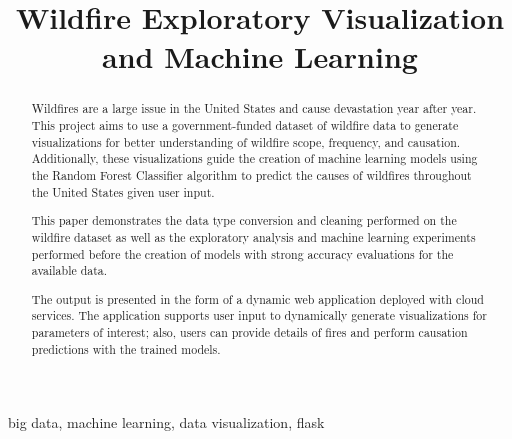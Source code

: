 \documentclass[conference]{IEEEtran}
\begin{document}
\title{Wildfire Exploratory Visualization and Machine Learning\\}

\author{
\and
{}
}

\maketitle

\begin{abstract}
    Wildfires are a large issue in the United States and cause devastation year after year. This project aims to use a government-funded dataset of wildfire data to generate visualizations for better understanding of wildfire scope, frequency, and causation. Additionally, these visualizations guide the creation of machine learning models using the Random Forest Classifier algorithm to predict the causes of wildfires throughout the United States given user input. \par
    This paper demonstrates the data type conversion and cleaning performed on the wildfire dataset as well as the exploratory analysis and machine learning experiments performed before the creation of models with strong accuracy evaluations for the available data. \par
    The output is presented in the form of a dynamic web application deployed with cloud services. The application supports user input to dynamically generate visualizations for parameters of interest; also, users can provide details of fires and perform causation predictions with the trained models.
    \linebreak
\end{abstract}

\begin{IEEEkeywords}
big data, machine learning, data visualization, flask
\end{IEEEkeywords}
\end{document}
